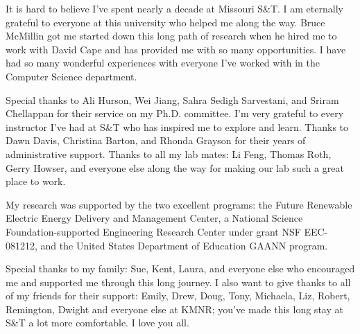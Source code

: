 It is hard to believe I've spent nearly a decade at Missouri S\&T. I am eternally grateful to everyone at this university who helped me along the way.  Bruce McMillin got me started down this long path of research when he hired me to work with David Cape and has provided me with so many opportunities. I have had so many wonderful experiences with everyone I've worked with in the Computer Science department.

Special thanks to Ali Hurson, Wei Jiang,  Sahra Sedigh Sarvestani, and Sriram Chellappan for their service on my Ph.D. committee. I'm very grateful to every instructor I've had at S\&T who has inspired me to explore and learn. Thanks to Dawn Davis, Christina Barton, and Rhonda
Grayson for their years of administrative support. Thanks to all my lab mates: Li Feng, Thomas Roth, Gerry Howser, and everyone else along the way for making our lab such a great place to work.

My research was supported by the two excellent programs:  the Future Renewable Electric Energy Delivery and Management Center, a National Science Foundation-supported Engineering Research Center under grant NSF EEC-081212, and the United States Department of Education GAANN program.

Special thanks to my family: Sue, Kent, Laura, and everyone else who encouraged me and supported me through this long journey. I also want to give thanks to all of my friends for their support: Emily, Drew, Doug, Tony, Michaela, Liz, Robert, Remington, Dwight and everyone else at KMNR; you've made this long stay at S\&T a lot  more comfortable. I love you all.
